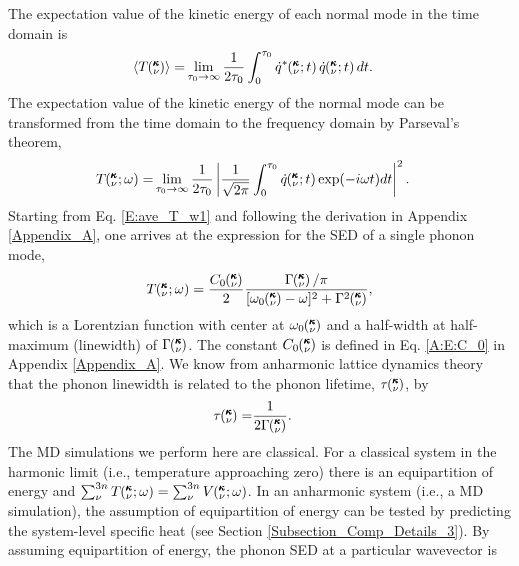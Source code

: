 \documentclass[aps,prb,preprint,superscriptaddress,amsmath,amssymb,floatfix]{revtex4}
\newcommand{\kvt}{\mspace{-4.0mu}\left(\mspace{-8.0mu}\begin{smallmatrix}&\pmb{\kappa} \\&\nu\end{smallmatrix}\mspace{-2.0mu};t\right)}
\newcommand{\kvw}{\mspace{-4.0mu}\left(\mspace{-8.0mu}\begin{smallmatrix}&\pmb{\kappa} \\&\nu\end{smallmatrix}\mspace{-2.0mu};\omega\right)}
\newcommand{\kv}{\mspace{-4.0mu}\left(\mspace{-8.0mu}\begin{smallmatrix}&\pmb{\kappa} \\&\nu\end{smallmatrix}\mspace{-3.0mu}\right)}
\begin{document}
The expectation value of the kinetic energy of each normal mode in the time domain is
\begin{equation}\label{A:E:ave_T_t}
\begin{split}
\langle T\kv \rangle=&\lim_{\tau_0\rightarrow\infty}\frac{1}{2\tau_0}\int_{0}^{\tau_0}\dot{q}^*\kvt\dot{q}\kvt dt.
\end{split}
\end{equation}
The expectation value of the kinetic energy of the normal mode can be transformed from the time domain to the
frequency domain by Parseval's theorem,\cite{rudin1987}
\begin{equation}\label{E:ave_T_w1}
\begin{split}
T\kvw=&\lim_{\tau_0\rightarrow\infty}\frac{1}{2\tau_0}\left|\frac{1}{\sqrt{2\pi}}\int_{0}^{\tau_0}\dot{q}\kvt\exp(-i\omega t)dt\right|^2.
\end{split}
\end{equation}
Starting from Eq$.$ \eqref{E:ave_T_w1} and following the derivation in Appendix \ref{Appendix_A}, one arrives at the expression for the SED of a single phonon mode,
\begin{equation}\label{E:Lorentzian_NMD_2}
\begin{split}
T\kvw = \frac{C_0\kv}{2}\frac{\Gamma\kv/\pi}{[\omega_0\kv-\omega]^2+\Gamma^2\kv},
\end{split}
\end{equation}
which is a Lorentzian function with center at $\omega_0\kv$ and a half-width at half-maximum (linewidth) of
$\Gamma\kv$. The constant $C_0\kv$ is defined in Eq$.$ \eqref{A:E:C_0} in Appendix \ref{Appendix_A}. We know from anharmonic lattice dynamics theory that the phonon linewidth is related to the phonon lifetime, $\tau\kv$, by\cite{maradudin1962,ladd1986}
\begin{equation}\label{E:lifetime}
\begin{split}
\tau\kv=&\frac{1}{2\Gamma\kv}.
\end{split}
\end{equation}
The MD simulations we perform here are classical. For a classical system in the harmonic limit (i.e., temperature approaching zero) there is an equipartition of energy and $\sum_{\nu}^{3n} T\kvw = \sum_{\nu}^{3n} V\kvw$.\cite{mcquarrie2000} In an anharmonic system (i.e., a MD simulation), the assumption of equipartition of energy can be tested by predicting the system-level specific heat (see Section \ref{Subsection_Comp_Details_3}). By assuming equipartition of energy, the phonon SED at a particular wavevector is
\end{document}
